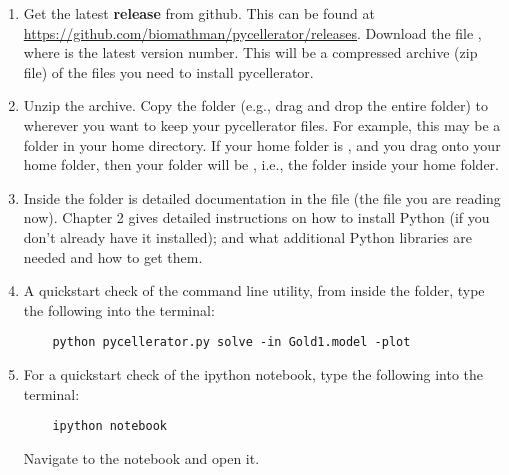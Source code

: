 \begin{enumerate}
\item Get the latest \textbf{release} from github. This can be found at \url{https://github.com/biomathman/pycellerator/releases}. Download the file , where  is the latest version number. This will be a compressed archive (zip file) of the files you need to install pycellerator.

\item  Unzip the archive.  Copy the folder  (e.g., drag and drop the entire folder) to wherever you want to keep your pycellerator files. For example, this may be a folder in your home directory. If your home folder is , and you drag  onto your home folder, then your  folder will be , i.e., the folder  inside your home folder. 

\item Inside the  folder is detailed documentation in the 
file  (the file you are reading now). Chapter 2 gives detailed instructions on how to
install Python (if you don't already have it installed); and what additional
Python libraries are needed and how to get them.

\item A quickstart check of the command line utility, from inside the  folder, type the following into the terminal:
\begin{lstlisting}
    python pycellerator.py solve -in Gold1.model -plot
\end{lstlisting}

\item For a quickstart check of the ipython notebook, type the following into the terminal:
\begin{lstlisting}
    ipython notebook
\end{lstlisting}
Navigate to the notebook  and open it.

\end{enumerate}


